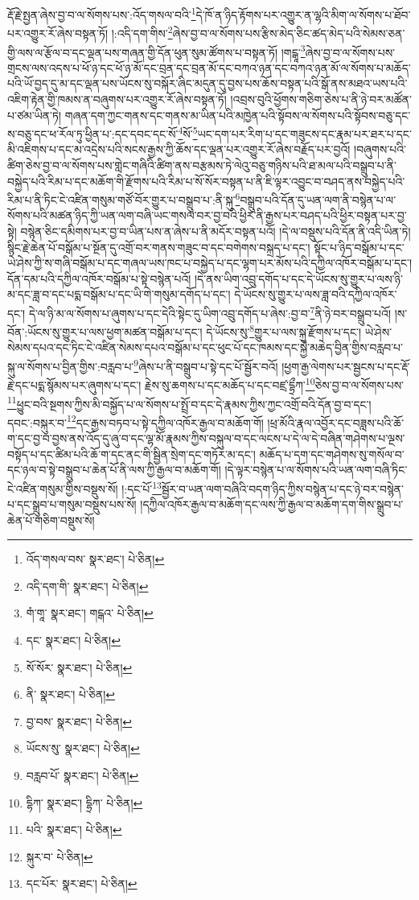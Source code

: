 རྡོ་རྗེ་སྤྱན་ཞེས་བྱ་བ་ལ་སོགས་པས་:འོད་གསལ་བའི་\footnote{འོད་གསལ་བས་  སྣར་ཐང་།  པེ་ཅིན། }དེ་ཁོ་ན་ཉིད་རྟོགས་པར་འགྱུར་ན་ལྷའི་མིག་ལ་སོགས་པ་ཐོབ་པར་འགྱུར་རོ་ཞེས་བསྟན་ཏོ། །:འདི་དག་གིས་\footnote{འདི་དག་གི་  སྣར་ཐང་།  པེ་ཅིན། }ཞེས་བྱ་བ་ལ་སོགས་པས་རྩིས་མེད་ཅིང་ཚད་མེད་པའི་སེམས་ཅན་གྱི་ལས་ལ་རྩོལ་བ་དང་ལྡན་པས་གཞན་གྱི་དོན་ཕུན་སུམ་ཚོགས་པ་བསྟན་ཏོ། །གངྒཱ་\footnote{གཾ་གཱ་  སྣར་ཐང་། གངྒའ་  པེ་ཅིན། }ཞེས་བྱ་བ་ལ་སོགས་པས་གྲངས་ལས་འདས་པ་ཕོ་ཉ་དང་ཕོ་ཉ་མོ་དང་བྲན་དང་བྲན་མོ་དང་བཀའ་ཉན་དང་བཀའ་ཉན་མོ་ལ་སོགས་པ་མཆོད་པའི་ཡོ་བྱད་དུ་མ་དང་ལྡན་པས་ཡོངས་སུ་བསྐོར་ཞིང་མདུན་དུ་བྱས་པས་ཆོས་བསྟན་པའི་སྒོ་ནས་མཐའ་ཡས་པའི་འཇིག་རྟེན་གྱི་ཁམས་ན་བཞུགས་པར་འགྱུར་རོ་ཞེས་བསྟན་ཏོ། །འབྲས་བུའི་ཕྱོགས་གཅིག་ཅེས་པ་ནི་ཉེ་བར་མཚོན་པ་ཙམ་ཡིན་ཏེ། གཞན་དག་ཀྱང་གནས་དང་གནས་མ་ཡིན་པའི་མཁྱེན་པའི་སྟོབས་ལ་སོགས་པའི་སྟོབས་བཅུ་དང་ས་བཅུ་དང་ཕ་རོལ་ཏུ་ཕྱིན་པ་:དང་དབང་དང་སོ་\footnote{དང་  སྣར་ཐང་།  པེ་ཅིན། }སོ་\footnote{སོ་སོར་  སྣར་ཐང་།  པེ་ཅིན། }ཡང་དག་པར་རིག་པ་དང་གཟུངས་དང་རྣམ་པར་ཐར་པ་དང་མི་འཇིགས་པ་དང་མ་འདྲེས་པའི་སངས་རྒྱས་ཀྱི་ཆོས་དང་ལྡན་པར་འགྱུར་རོ་ཞེས་བརྗོད་པར་བྱའོ། །བཞུགས་པའི་ཚིག་ཅེས་བྱ་བ་ལ་སོགས་པས་གླེང་གཞིའི་ཚིག་ནས་བརྩམས་ཏེ་ལེའུ་བཅུ་གཉིས་པའི་ཐ་མལ་པའི་བསྒྲུབ་པ་ནི་བསྐྱེད་པའི་རིམ་པ་དང་མཆོག་གི་རྫོགས་པའི་རིམ་པ་སོ་སོར་བསྟན་པ་ནི་ཇི་ལྟར་འབྱུང་བ་བཤད་ནས་བསྐྱེད་པའི་རིམ་པ་ནི་ཏིང་ངེ་འཛིན་གསུམ་གཙོ་བོར་གྱུར་པ་བསྒྲུབ་པ་:ནི་སྐུ་\footnote{ནི་  སྣར་ཐང་།  པེ་ཅིན། }བསྒྲུབ་པའི་དོན་དུ་ཡན་ལག་ནི་བསྙེན་པ་ལ་སོགས་པའི་མཚན་ཉིད་ཀྱི་ཡན་ལག་བཞི་ཡང་གསལ་བར་བྱ་བའི་ཕྱིར་ནི་རྒྱས་པར་བཤད་པའི་ཕྱིར་བསྟན་པར་བྱ་སྟེ། བསྙེན་ཅིང་དམིགས་པར་བྱ་བ་ཡིན་པས་ན་ཞེས་པ་ནི་མདོར་བསྟན་པའོ། །དེ་ལ་བསྡུས་པའི་དོན་ནི་འདི་ཡིན་ཏེ། སྙིང་རྗེ་ཆེན་པོ་བསྒོམ་པ་སྔོན་དུ་འགྲོ་བར་གནས་གཟུང་བ་དང་བགེགས་བསྐྲད་པ་དང་། སྟོང་པ་ཉིད་བསྒོམ་པ་དང་ཡེ་ཤེས་ཀྱི་ས་གཞི་བསྒོམ་པ་དང་གཞལ་ཡས་ཁང་པ་བསྐྱེད་པ་དང་ལྷག་པར་མོས་པའི་དཀྱིལ་འཁོར་བསྒོམ་པ་དང་། དོན་དམ་པའི་དཀྱིལ་འཁོར་བསྒོམ་པ་སྟེ་བསྙེན་པའོ། །དེ་ནས་ཡིག་འབྲུ་དགོད་པ་དང་དེ་ཡོངས་སུ་གྱུར་པ་ལས་ཉི་མ་དང་ཟླ་བ་དང་པདྨ་བསྒོམ་པ་དང་ཡི་གེ་གསུམ་དགོད་པ་དང་། དེ་ཡོངས་སུ་གྱུར་པ་ལས་ཟླ་བའི་དཀྱིལ་འཁོར་དང་། དེ་ལ་ཉི་མ་ལ་སོགས་པ་ཞུགས་པ་དང་དེའི་སྟེང་དུ་ཡིག་འབྲུ་དགོད་པ་ཞེས་:བྱ་བ་\footnote{བྱ་བས་  སྣར་ཐང་།  པེ་ཅིན། }ནི་ཉེ་བར་བསྒྲུབ་པའོ། །ས་བོན་:ཡོངས་སུ་གྱུར་པ་ལས་ཕྱག་མཚན་བསྒོམ་པ་དང་། དེ་ཡོངས་སུ་\footnote{ཡོངས་སུ་  སྣར་ཐང་།  པེ་ཅིན། }གྱུར་པ་ལས་སྐུ་རྫོགས་པ་དང་། ཡེ་ཤེས་སེམས་དཔའ་དང་ཏིང་ངེ་འཛིན་སེམས་དཔའ་བསྒོམ་པ་དང་ཕུང་པོ་དང་ཁམས་དང་སྐྱེ་མཆེད་བྱིན་གྱིས་བརླབ་པ་སྐུ་ལ་སོགས་པ་བྱིན་གྱིས་:བརླབ་པ་\footnote{བརླབ་པོ་  སྣར་ཐང་།  པེ་ཅིན། }ཞེས་པ་ནི་བསྒྲུབ་པ་སྟེ་དང་པོ་སྦྱོར་བའོ། །ཕྱག་རྒྱ་ལེགས་པར་སྦྱངས་པ་དང་རྡོ་རྗེ་དང་པདྨ་སྙོམས་པར་ཞུགས་པ་དང་། རྗེས་སུ་ཆགས་པ་དང་མཆོད་པ་དང་བཛྲ་དྷྲྀཀ་\footnote{དྷིཀ་  སྣར་ཐང་། དྷྲིཀ་  པེ་ཅིན། }ཅེས་བྱ་བ་ལ་སོགས་པས་\footnote{པའི་  སྣར་ཐང་།  པེ་ཅིན། }ཕྱུང་བའི་སྔགས་ཀྱིས་མི་བསྐྱོད་པ་ལ་སོགས་པ་སྤྲོ་བ་དང་དེ་རྣམས་ཀྱིས་ཀྱང་འགྲོ་བའི་དོན་བྱ་བ་དང་། དབང་:བསྐུར་བ་\footnote{སྐུར་བ་  པེ་ཅིན། }དང་རྒྱས་བཏབ་པ་སྟེ་དཀྱིལ་འཁོར་རྒྱལ་བ་མཆོག་གོ། །ཕྲ་མོའི་རྣལ་འབྱོར་དང་བཟླས་པའི་ཆོ་ག་དང་བྱ་བ་བྱས་ནས་འོད་དུ་ཞུ་བ་དང་ལྷ་མོ་རྣམས་ཀྱིས་བསྐུལ་བ་དང་ལངས་པ་དེ་ལ་དེ་བཞིན་གཤེགས་པ་ལྔས་བསྟོད་པ་དང་ཚིམ་པའི་ཆོ་ག་དང་ནང་གི་སྦྱིན་སྲེག་དང་གཏོར་མ་དང་། མཆོད་པ་དག་དང་གཤེགས་སུ་གསོལ་བ་དང་ཉལ་བ་སྟེ་བསྒྲུབ་པ་ཆེན་པོ་ནི་ལས་ཀྱི་རྒྱལ་བ་མཆོག་གོ། །དེ་ལྟར་བསྙེན་པ་ལ་སོགས་པའི་ཡན་ལག་བཞི་ཏིང་ངེ་འཛིན་གསུམ་གྱིས་བསྡུས་སོ། །:དང་པོ་\footnote{དང་པོར་  སྣར་ཐང་།  པེ་ཅིན། }སྦྱོར་བ་ཡན་ལག་བཞིའི་བདག་ཉིད་ཀྱིས་བསྙེན་པ་དང་ཉེ་བར་བསྙེན་པ་དང་སྒྲུབ་པ་གསུམ་བསྡུས་པས་སོ། །དཀྱིལ་འཁོར་རྒྱལ་བ་མཆོག་དང་ལས་ཀྱི་རྒྱལ་བ་མཆོག་དག་གིས་སྒྲུབ་པ་ཆེན་པོ་གཅིག་བསྡུས་སོ། 